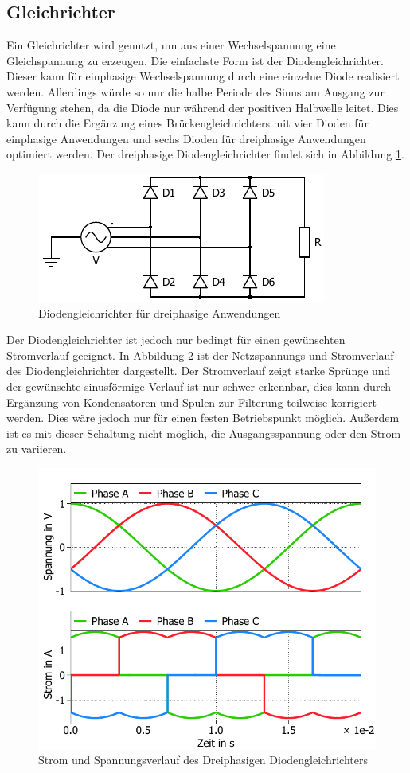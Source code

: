 		\subsection{Gleichrichter}
		\label{sec:Rec}
		Ein Gleichrichter wird genutzt, um aus einer Wechselspannung eine Gleichspannung zu erzeugen. Die einfachste Form ist der Diodengleichrichter. Dieser kann für einphasige Wechselspannung durch eine einzelne Diode realisiert werden. Allerdings würde so nur die halbe Periode des Sinus am Ausgang zur Verfügung stehen, da die Diode nur während der positiven Halbwelle leitet. Dies kann durch die Ergänzung eines Brückengleichrichters mit vier Dioden für einphasige Anwendungen und sechs Dioden für dreiphasige Anwendungen optimiert werden. Der dreiphasige Diodengleichrichter findet sich in Abbildung \ref{fig:B6DiodRect}. 
		\begin{figure}[H]
			\centering
			\includegraphics[width=0.8\linewidth]{content/Grafiken/Plecs_Diodengleichrichter.pdf}
			\caption{Diodengleichrichter für dreiphasige Anwendungen}
			\label{fig:B6DiodRect}
		\end{figure}
		Der Diodengleichrichter ist jedoch nur bedingt für einen gewünschten Stromverlauf geeignet. In Abbildung \ref{fig:B6DiodRectI} ist der Netzspannungs und Stromverlauf des Diodengleichrichter dargestellt. Der Stromverlauf zeigt starke Sprünge und der gewünschte sinusförmige Verlauf ist nur schwer erkennbar, dies kann durch Ergänzung von Kondensatoren und Spulen zur Filterung teilweise korrigiert werden. Dies wäre jedoch nur für einen festen Betriebspunkt möglich. Außerdem ist es mit dieser Schaltung nicht möglich, die Ausgangsspannung oder den Strom zu variieren.
		\begin{figure}
			\centering
			\includegraphics[width=0.8\linewidth]{content/Grafiken/B6-Diodengleichrichter-Eingangsverlauf}
			\caption{Strom und Spannungsverlauf des Dreiphasigen Diodengleichrichters }
			\label{fig:B6DiodRectI}
		\end{figure}

